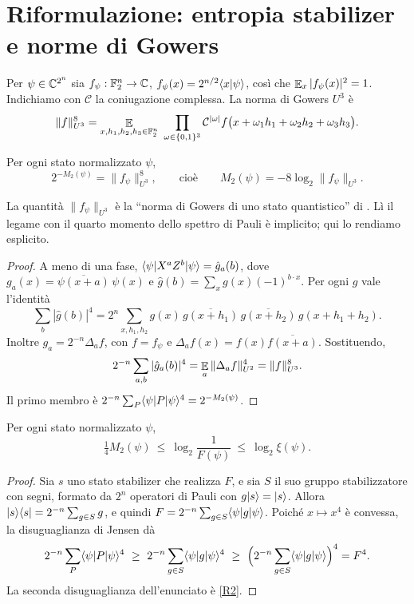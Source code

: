 \section{Riformulazione: entropia stabilizer e norme di Gowers}\label{sec:sre}

Per $\psi\in\mathbb C^{2^n}$ sia $f_\psi:\mathbb F_2^n\to\mathbb C$, $f_\psi(x)=2^{n/2}\langle x\vert \psi\rangle$, così che $\mathop{\mathbb E}_x|f_\psi(x)|^2=1$. Indichiamo con $\mathcal C$ la coniugazione complessa. La norma di Gowers $U^3$ è
\[
\|f\|_{U^3}^8=\E_{x,h_1,h_2,h_3\in\Fb_2^n}\ \prod_{\omega\in\{0,1\}^3}\mathcal C^{|\omega|}f\bigl(x+\omega_1h_1+\omega_2h_2+\omega_3h_3\bigr).
\]

\begin{proposition}[SRE $=$ Gowers $U^3$]\label{prop:gowers}
Per ogni stato normalizzato $\psi$,
\[
2^{-M_2(\psi)}=\|f_\psi\|_{U^3}^8,\qquad\text{cioè}\qquad M_2(\psi)=-8\log_2\|f_\psi\|_{U^3}.
\]
\end{proposition}

\noindent La quantità $\|f_\psi\|_{U^3}$ è la ``norma di Gowers di uno stato quantistico'' di \cite{AD24}. Lì il legame con il quarto momento dello spettro di Pauli è implicito; qui lo rendiamo esplicito.

\begin{proof}
A meno di una fase, $\langle \psi\rvert X^aZ^b\lvert \psi\rangle=\hat g_a(b)$, dove $g_a(x)=\overline{\psi(x+a)}\,\psi(x)$ e $\hat g(b)=\sum_xg(x)(-1)^{b\cdot x}$. Per ogni $g$ vale l'identità
\[
\sum_b|\hat g(b)|^4=2^n\sum_{x,h_1,h_2}g(x)\,\overline{g(x+h_1)}\,\overline{g(x+h_2)}\,g(x+h_1+h_2).
\]
Inoltre $g_a=2^{-n}\Delta_af$, con $f=f_\psi$ e $\Delta_af(x)=f(x)\overline{f(x+a)}$. Sostituendo,
\[
2^{-n}\sum_{a,b}|\hat g_a(b)|^4=\mathop{\mathbb E}_a\|\Delta_af\|_{U^2}^4=\|f\|_{U^3}^8 .
\]
Il primo membro è $2^{-n}\sum_P\langle \psi\rvert P\lvert \psi\rangle^4=2^{-M_2(\psi)}$.
\end{proof}

\begin{proposition}\label{prop:M2F}
Per ogni stato normalizzato $\psi$,
\[
\tfrac14M_2(\psi)\ \le\ \log_2\frac1{F(\psi)}\ \le\ \log_2\xi(\psi).
\]
\end{proposition}

\begin{proof}
Sia $s$ uno stato stabilizer che realizza $F$, e sia $S$ il suo gruppo stabilizzatore con segni, formato da $2^n$ operatori di Pauli con $g\lvert s\rangle=\lvert s\rangle$. Allora $\lvert s\rangle\langle s\rvert=2^{-n}\sum_{g\in S}g$, e quindi $F=2^{-n}\sum_{g\in S}\langle \psi\rvert g\lvert \psi\rangle$. Poiché $x\mapsto x^4$ è convessa, la disuguaglianza di Jensen dà
\[
2^{-n}\sum_{P}\bra\psi P\ket\psi^4\ \ge\ 2^{-n}\sum_{g\in S}\bra\psi g\ket\psi^4\ \ge\ \Bigl(2^{-n}\sum_{g\in S}\bra\psi g\ket\psi\Bigr)^4=F^4.
\]
La seconda disuguaglianza dell'enunciato è \ref{R2}.
\end{proof}

